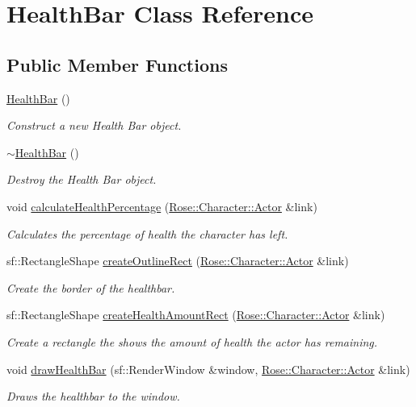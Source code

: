 \hypertarget{classHealthBar}{}\section{Health\+Bar Class Reference}
\label{classHealthBar}
\subsection*{Public Member Functions}
\begin{DoxyCompactItemize}
\item 
\mbox{\hyperlink{classHealthBar_a05f694deecdc0399d9c5fb230493df05}{Health\+Bar}} ()
\begin{DoxyCompactList}\small\item\em Construct a new Health Bar object. \end{DoxyCompactList}\item 
\mbox{\hyperlink{classHealthBar_a4a67801ba7a3b2e82e61d0cd02247771}{$\sim$\+Health\+Bar}} ()
\begin{DoxyCompactList}\small\item\em Destroy the Health Bar object. \end{DoxyCompactList}\item 
void \mbox{\hyperlink{classHealthBar_a61e6713d7078197e549d5d979d2b34c6}{calculate\+Health\+Percentage}} (\mbox{\hyperlink{classRose_1_1Character_1_1Actor}{Rose\+::\+Character\+::\+Actor}} \&link)
\begin{DoxyCompactList}\small\item\em Calculates the percentage of health the character has left. \end{DoxyCompactList}\item 
sf\+::\+Rectangle\+Shape \mbox{\hyperlink{classHealthBar_a79b4a771bcf2dcea3723089e075451d0}{create\+Outline\+Rect}} (\mbox{\hyperlink{classRose_1_1Character_1_1Actor}{Rose\+::\+Character\+::\+Actor}} \&link)
\begin{DoxyCompactList}\small\item\em Create the border of the healthbar. \end{DoxyCompactList}\item 
sf\+::\+Rectangle\+Shape \mbox{\hyperlink{classHealthBar_ab6275c757258bfa46f6416201bdd3c83}{create\+Health\+Amount\+Rect}} (\mbox{\hyperlink{classRose_1_1Character_1_1Actor}{Rose\+::\+Character\+::\+Actor}} \&link)
\begin{DoxyCompactList}\small\item\em Create a rectangle the shows the amount of health the actor has remaining. \end{DoxyCompactList}\item 
void \mbox{\hyperlink{classHealthBar_a698ad26d6a842a1365bf7655a7e69def}{draw\+Health\+Bar}} (sf\+::\+Render\+Window \&window, \mbox{\hyperlink{classRose_1_1Character_1_1Actor}{Rose\+::\+Character\+::\+Actor}} \&link)
\begin{DoxyCompactList}\small\item\em Draws the healthbar to the window. \end{DoxyCompactList}\end{DoxyCompactItemize}
